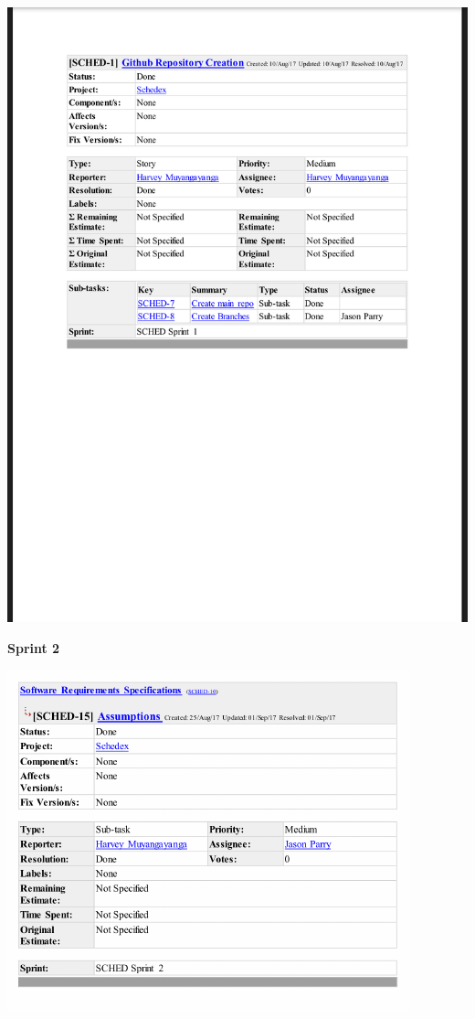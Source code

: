 \documentclass{article}
\begin{document}
\centerline{\includegraphics[scale=0.4]{sprint1_6}}

\textbf{Sprint 2}

\centerline{\includegraphics[scale=1]{sprint2_1}}
\end{document}
